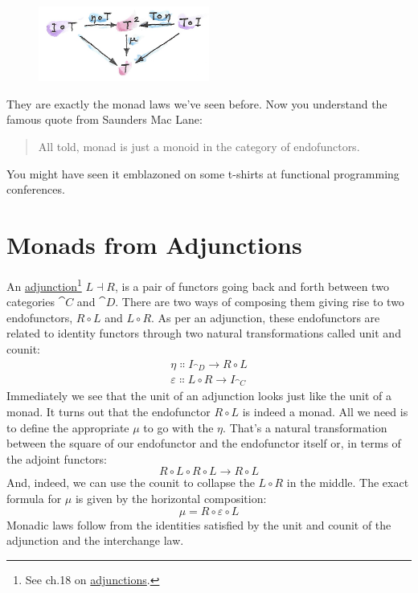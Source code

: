\begin{figure}[H]
  \centering
  \includegraphics[width=0.5\textwidth]{images/unitlawcomp.png}
\end{figure}

\noindent
They are exactly the monad laws we've seen before. Now you understand
the famous quote from Saunders Mac Lane:

\begin{quote}
  All told, monad is just a monoid in the category of endofunctors.
\end{quote}
You might have seen it emblazoned on some t-shirts at functional
programming conferences.

\section{Monads from Adjunctions}

An \hyperref[adjunctions]{adjunction}\footnote{See ch.18 on \hyperref[adjunctions]{adjunctions}.}
$L \dashv R$, is a pair of functors going back and forth between two
categories $\cat{C}$ and $\cat{D}$. There are two ways of composing them
giving rise to two endofunctors, $R \circ L$ and $L \circ R$.
As per an adjunction, these endofunctors are related to identity
functors through two natural transformations called unit and counit:
\begin{gather*}
  \eta \Colon I_{\cat{D}} \to R \circ L \\
  \varepsilon \Colon L \circ R \to I_{\cat{C}}
\end{gather*}
Immediately we see that the unit of an adjunction looks just like the
unit of a monad. It turns out that the endofunctor $R \circ L$ is
indeed a monad. All we need is to define the appropriate $\mu$ to go with
the $\eta$. That's a natural transformation between the square of our
endofunctor and the endofunctor itself or, in terms of the adjoint
functors:
\[R \circ L \circ R \circ L \to R \circ L\]
And, indeed, we can use the counit to collapse the $L \circ R$ in
the middle. The exact formula for $\mu$ is given by the horizontal
composition:
\[\mu = R \circ \varepsilon \circ L\]
Monadic laws follow from the identities satisfied by the unit and counit
of the adjunction and the interchange law.

